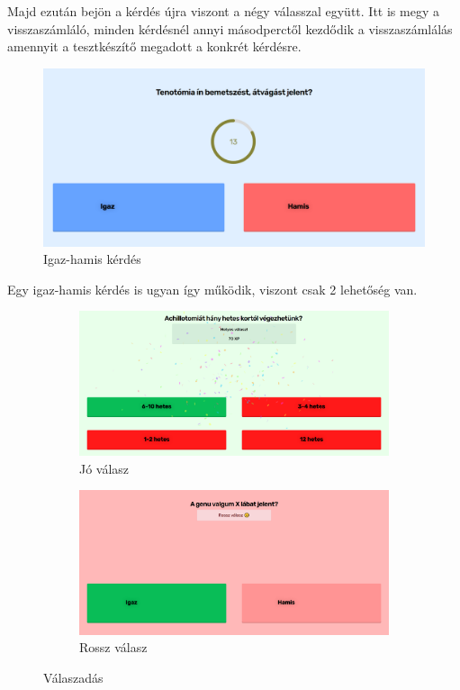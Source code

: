 Majd ezután bejön a kérdés újra viszont a négy válasszal együtt. Itt is megy a visszaszámláló, minden kérdésnél annyi másodperctől kezdődik a visszaszámlálás amennyit a tesztkészítő megadott a konkrét kérdésre.

\begin{figure}[H]
    \centering
    \includegraphics[width=\linewidth]{images/question2.png}
    \caption{Igaz-hamis kérdés}
\end{figure}

Egy igaz-hamis kérdés is ugyan így működik, viszont csak 2 lehetőség van.


\begin{figure}[H]
    \centering
    \begin{subfigure}{0.5\textwidth}
        \centering
        \includegraphics[width=\linewidth]{images/question_good.png}
        \caption{Jó válasz}
        \label{fig:sub1}
    \end{subfigure}%
    \begin{subfigure}{0.5\textwidth}
        \centering
        \includegraphics[width=\linewidth]{images/question_wrong.png}
        \caption{Rossz válasz}
        \label{fig:sub2}
    \end{subfigure}
    \caption{Válaszadás}
    \label{fig:test}
\end{figure}

